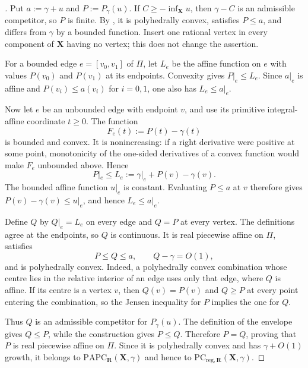 
\begin{proof}[]
Put $a:=\gamma+u$ and $P:=P_\gamma(u)$.  If $C\geq-\inf_{\mathbf X}u$,
then $\gamma-C$ is an admissible competitor, so $P$ is finite.  By
\cite[Proposition~6.3]{BMPS26}, it is polyhedrally convex, satisfies
$P\leq a$, and differs from $\gamma$ by a bounded function.  Insert one
rational vertex in every component of $\mathbf X$ having no vertex; this does
not change the assertion.

For a bounded edge $e=[v_0,v_1]$ of $\Pi$, let $L_e$ be the affine function
on $e$ with values $P(v_0)$ and $P(v_1)$ at its endpoints.  Convexity gives
$P|_e\leq L_e$.  Since $a|_e$ is affine and $P(v_i)\leq a(v_i)$ for
$i=0,1$, one also has $L_e\leq a|_e$.

Now let $e$ be an unbounded edge with endpoint $v$, and use its primitive
integral-affine coordinate $t\geq0$.  The function
\[
                    F_e(t):=P(t)-\gamma(t)
\]
is bounded and convex.  It is nonincreasing: if a right derivative were
positive at some point, monotonicity of the one-sided derivatives of a convex
function would make $F_e$ unbounded above.  Hence
\[
 P|_e\leq L_e:=\gamma|_e+P(v)-\gamma(v).
\]
The bounded affine function $u|_e$ is constant.  Evaluating $P\leq a$ at
$v$ therefore gives $P(v)-\gamma(v)\leq u|_e$, and hence $L_e\leq a|_e$.

Define $Q$ by $Q|_e=L_e$ on every edge and $Q=P$ at every vertex.  The
definitions agree at the endpoints, so $Q$ is continuous.  It is real
piecewise affine on $\Pi$, satisfies
\[
                         P\leq Q\leq a,
 \qquad Q-\gamma=O(1),
\]
and is polyhedrally convex.  Indeed, a polyhedrally convex combination whose
centre lies in the relative interior of an edge uses only that edge, where
$Q$ is affine.  If its centre is a vertex $v$, then $Q(v)=P(v)$ and
$Q\geq P$ at every point entering the combination, so the Jensen inequality
for $P$ implies the one for $Q$.

Thus $Q$ is an admissible competitor for $P_\gamma(u)$.  The definition of
the envelope gives $Q\leq P$, while the construction gives $P\leq Q$.
Therefore $P=Q$, proving that $P$ is real piecewise affine on $\Pi$.  Since
it is polyhedrally convex and has $\gamma+O(1)$ growth, it belongs to
$\mathrm{PAPC}_{\mathbf R}(\mathbf X,\gamma)$ and hence to
$\mathrm{PC}_{\mathrm{reg},\mathbf R}(\mathbf X,\gamma)$.
\end{proof}

